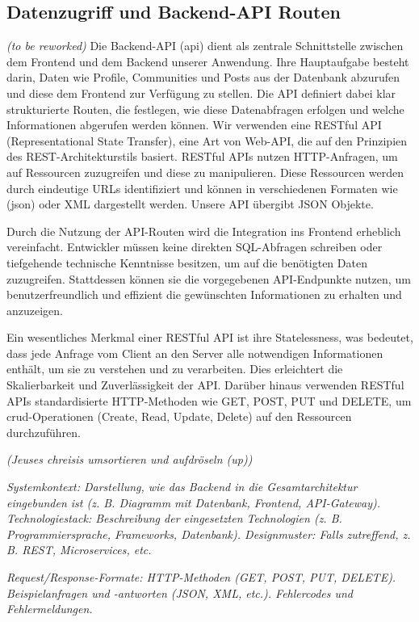 \documentclass[a4paper,12pt]{article}
\begin{document}
\subsection{Datenzugriff und Backend-API Routen}
\textit{(to be reworked)}
Die Backend-API (\gls{api}) dient als zentrale Schnittstelle zwischen dem Frontend und dem Backend unserer Anwendung. Ihre Hauptaufgabe besteht darin, Daten wie Profile, Communities und Posts aus der Datenbank abzurufen und diese dem Frontend zur Verfügung zu stellen. Die API definiert dabei klar strukturierte Routen, die festlegen, wie diese Datenabfragen erfolgen und welche Informationen abgerufen werden können. Wir verwenden eine RESTful API (Representational State Transfer), eine Art von Web-API, die auf den Prinzipien des REST-Architekturstils basiert. RESTful APIs nutzen HTTP-Anfragen, um auf Ressourcen zuzugreifen und diese zu manipulieren. Diese Ressourcen werden durch eindeutige URLs identifiziert und können in verschiedenen Formaten wie (\gls{json}) oder XML dargestellt werden. Unsere API übergibt JSON Objekte.

Durch die Nutzung der API-Routen wird die Integration ins Frontend erheblich vereinfacht. Entwickler müssen keine direkten SQL-Abfragen schreiben oder tiefgehende technische Kenntnisse besitzen, um auf die benötigten Daten zuzugreifen. Stattdessen können sie die vorgegebenen API-Endpunkte nutzen, um benutzerfreundlich und effizient die gewünschten Informationen zu erhalten und anzuzeigen.

Ein wesentliches Merkmal einer RESTful API ist ihre Statelessness, was bedeutet, dass jede Anfrage vom Client an den Server alle notwendigen Informationen enthält, um sie zu verstehen und zu verarbeiten. Dies erleichtert die Skalierbarkeit und Zuverlässigkeit der API. Darüber hinaus verwenden RESTful APIs standardisierte HTTP-Methoden wie GET, POST, PUT und DELETE, um \gls{crud}-Operationen (Create, Read, Update, Delete) auf den Ressourcen durchzuführen.

\textit{(Jeuses chreisis umsortieren und aufdröseln (up))}

\textit{Systemkontext: Darstellung, wie das Backend in die Gesamtarchitektur
eingebunden ist (z. B. Diagramm mit Datenbank, Frontend, API-Gateway).
Technologiestack: Beschreibung der eingesetzten Technologien (z. B.
Programmiersprache, Frameworks, Datenbank).
Designmuster: Falls zutreffend, z. B. REST, Microservices, etc. }



\textit{Request/Response-Formate: HTTP-Methoden (GET, POST, PUT, DELETE).
Beispielanfragen und -antworten (JSON, XML, etc.).  Fehlercodes und
Fehlermeldungen.}
\end{document}
